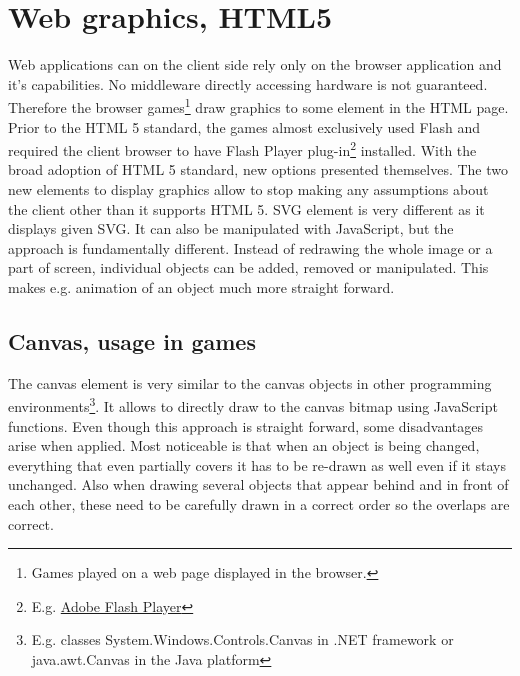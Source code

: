 \documentclass[11pt,oneside, final]{fithesis2}
\begin{document}
\section{Web graphics, HTML5}
Web applications can on the client side rely only on the browser application and it's capabilities. No middleware directly accessing hardware is not guaranteed. Therefore the browser games\footnote{Games played on a web page displayed in the browser.} draw graphics to some element in the HTML page. Prior to the HTML 5 standard, the games almost exclusively used Flash\cite{} and required the client browser to have Flash Player plug-in\footnote{E.g. \href{https://get2.adobe.com/cz/flashplayer/}{Adobe Flash Player}} installed. With the broad adoption of HTML 5 standard, new options presented themselves. The two new elements to display graphics allow to stop making any assumptions about the client other than it supports HTML 5. SVG element is very different as it displays given SVG. It can also be manipulated with JavaScript, but the approach is fundamentally different. Instead of redrawing the whole image or a part of screen, individual objects can be added, removed or manipulated. This makes e.g. animation of an object much more straight forward.

\subsection{Canvas, usage in games}
The canvas element is very similar to the canvas objects in other programming environments\footnote{E.g. classes System.Windows.Controls.Canvas in .NET framework\cite{net_canvas} or java.awt.Canvas in the Java platform\cite{java_canvas}}. It allows to directly draw to the canvas bitmap using JavaScript functions. Even though this approach is straight forward, some disadvantages arise when applied. Most noticeable is that when an object is being changed, everything that even partially covers it has to be re-drawn as well even if it stays unchanged. Also when drawing several objects that appear behind and in front of each other, these need to be carefully drawn in a correct order so the overlaps are correct.
\end{document}
